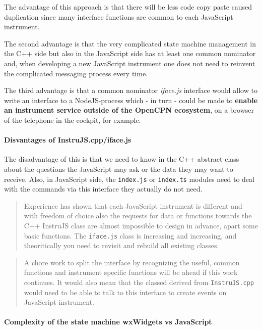 \documentclass[11pt]{article}
\begin{document}
    The advantage of this approach is that there will be less code copy
paste caused duplication since many interface functions are common to
each JavaScript instrument.

    The second advantage is that the very complicated state machine
management in the C++ side but also in the JavaScript side has at least
one common nominator and, when developing a new JavaScript instrument
one does not need to reinvent the complicated messaging process every
time.

    The third advantage is that a common nominator \emph{iface.js} interface
would allow to write an interface to a NodeJS-process which - in turn -
could be made to \textbf{enable an instrument service outside of the
OpenCPN ecosystem}, on a browser of the telephone in the cockpit, for
example.

    \hypertarget{disvantages-of-instrujs.cppiface.js}{%
\paragraph{Disvantages of
InstruJS.cpp/iface.js}\label{disvantages-of-instrujs.cppiface.js}}

    The disadvantage of this is that we need to know in the C++ abstract
class about the questions the JavaScript may ask or the data they may
want to receive. Also, in JavaScript side, the \texttt{index.js} or
\texttt{index.ts} modules need to deal with the commands via this
interface they actually do not need.

    \begin{quote}
Experience has shown that each JavaScript instrument is different and
with freedom of choice also the requests for data or functions towards
the C++ InstruJS class are almost impossible to design in advance, apart
some basic functions. The \texttt{iface.js} class is increasing and
increasing, and theoritically you need to revisit and rebuild all
existing classes.
\end{quote}

    \begin{quote}
A chore work to split the interface by recognizing the useful, common
functions and instrument specific functions will be ahead if this work
continues. It would also mean that the classed derived from
\texttt{InstruJS.cpp} would need to be able to talk to this interface to
create events on JavaScript instrument.
\end{quote}

    \hypertarget{complexity-of-the-state-machine-wxwidgets-vs-javascript}{%
\paragraph{Complexity of the state machine wxWidgets vs
JavaScript}\label{complexity-of-the-state-machine-wxwidgets-vs-javascript}}
\end{document}
